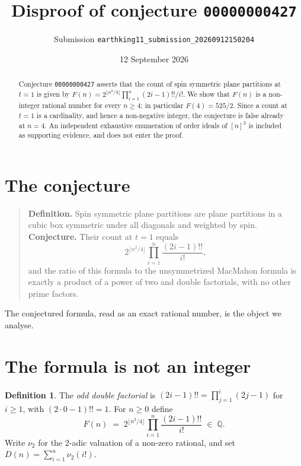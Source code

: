 \documentclass[11pt]{article}
\title{Disproof of conjecture \texttt{00000000427}}
\author{Submission \texttt{earthking11\_submission\_20260912150204}}
\date{12 September 2026}
\theoremstyle{definition}
\newtheorem{definition}[theorem]{Definition}
\begin{document}
\maketitle

\begin{abstract}
Conjecture \texttt{00000000427} asserts that the count of spin symmetric plane
partitions at $t=1$ is given by
$F(n) = 2^{\lfloor n^2/4\rfloor}\prod_{i=1}^{n}(2i-1)!!/i!$. We show that
$F(n)$ is a non-integer rational number for every $n\ge 4$; in particular
$F(4)=525/2$. Since a count at $t=1$ is a cardinality, and hence a
non-negative integer, the conjecture is false already at $n=4$. An independent
exhaustive enumeration of order ideals of $[n]^3$ is included as supporting
evidence, and does not enter the proof.
\end{abstract}

\section{The conjecture}

\begin{quote}
\textbf{Definition.} Spin symmetric plane partitions are plane partitions in a
cubic box symmetric under all diagonals and weighted by spin.\\[2pt]
\textbf{Conjecture.} Their count at $t = 1$ equals
\[
  2^{\lfloor n^{2}/4\rfloor}\prod_{i=1}^{n}\frac{(2i-1)!!}{i!},
\]
and the ratio of this formula to the unsymmetrized MacMahon formula is exactly a
product of a power of two and double factorials, with no other prime factors.
\end{quote}

The conjectured formula, read as an exact rational number, is the object we
analyse.

\section{The formula is not an integer}

\begin{definition}\label{def:F}
The \emph{odd double factorial} is
$(2i-1)!! = \prod_{j=1}^{i}(2j-1)$ for $i\ge 1$, with $(2\cdot 0-1)!! = 1$.
For $n\ge 0$ define
\[
  F(n) \;=\; 2^{\lfloor n^{2}/4\rfloor}\prod_{i=1}^{n}\frac{(2i-1)!!}{i!}
  \;\in\; \mathbb{Q}.
\]
Write $\nu_{2}$ for the $2$-adic valuation of a non-zero rational, and set
$D(n) = \sum_{i=1}^{n}\nu_{2}(i!)$.
\end{definition}
\end{document}
